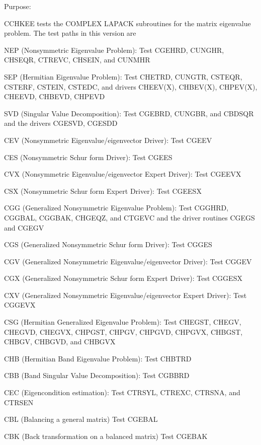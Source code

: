 \begin{DoxyParagraph}{Purpose\+: }
\begin{DoxyVerb} CCHKEE tests the COMPLEX LAPACK subroutines for the matrix
 eigenvalue problem.  The test paths in this version are

 NEP (Nonsymmetric Eigenvalue Problem):
     Test CGEHRD, CUNGHR, CHSEQR, CTREVC, CHSEIN, and CUNMHR

 SEP (Hermitian Eigenvalue Problem):
     Test CHETRD, CUNGTR, CSTEQR, CSTERF, CSTEIN, CSTEDC,
     and drivers CHEEV(X), CHBEV(X), CHPEV(X),
                 CHEEVD,   CHBEVD,   CHPEVD

 SVD (Singular Value Decomposition):
     Test CGEBRD, CUNGBR, and CBDSQR
     and the drivers CGESVD, CGESDD

 CEV (Nonsymmetric Eigenvalue/eigenvector Driver):
     Test CGEEV

 CES (Nonsymmetric Schur form Driver):
     Test CGEES

 CVX (Nonsymmetric Eigenvalue/eigenvector Expert Driver):
     Test CGEEVX

 CSX (Nonsymmetric Schur form Expert Driver):
     Test CGEESX

 CGG (Generalized Nonsymmetric Eigenvalue Problem):
     Test CGGHRD, CGGBAL, CGGBAK, CHGEQZ, and CTGEVC
     and the driver routines CGEGS and CGEGV

 CGS (Generalized Nonsymmetric Schur form Driver):
     Test CGGES

 CGV (Generalized Nonsymmetric Eigenvalue/eigenvector Driver):
     Test CGGEV

 CGX (Generalized Nonsymmetric Schur form Expert Driver):
     Test CGGESX

 CXV (Generalized Nonsymmetric Eigenvalue/eigenvector Expert Driver):
     Test CGGEVX

 CSG (Hermitian Generalized Eigenvalue Problem):
     Test CHEGST, CHEGV, CHEGVD, CHEGVX, CHPGST, CHPGV, CHPGVD,
     CHPGVX, CHBGST, CHBGV, CHBGVD, and CHBGVX

 CHB (Hermitian Band Eigenvalue Problem):
     Test CHBTRD

 CBB (Band Singular Value Decomposition):
     Test CGBBRD

 CEC (Eigencondition estimation):
     Test CTRSYL, CTREXC, CTRSNA, and CTRSEN

 CBL (Balancing a general matrix)
     Test CGEBAL

 CBK (Back transformation on a balanced matrix)
     Test CGEBAK


\end{DoxyVerb}
\end{DoxyParagraph}
